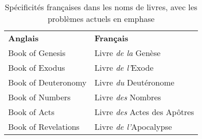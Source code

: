 \documentclass{ltxdoc}
\begin{document}
\begin{table}[tbh]
\caption{Spécificités françaises dans les noms de livres, avec les problèmes actuels en emphase} 
\label{tab:textspec}
\vspace{10pt}
\begin{center}
\begin{tabular}{lp{}}
\bfseries Anglais & \bfseries Français\\
Book of Genesis & Livre \emph{de la} Gen\`ese\\
Book of Exodus & Livre \emph{de l'}Exode\\
Book of Deuteronomy & Livre \emph{du} Deut\'eronome\\
Book of Numbers & Livre \emph{des} Nombres\\
Book of Acts & Livre \emph{des} Actes des Ap\^otres\\
Book of Revelations & Livre \emph{de l'}Apocalypse\\
\end{tabular}
\end{center}
\end{table}
\end{document}
